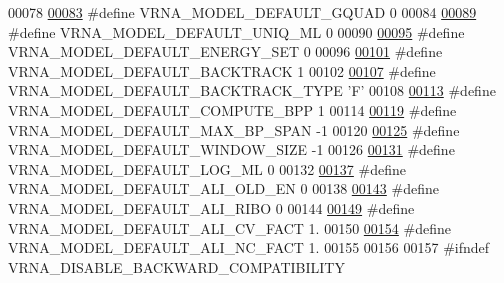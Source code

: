 \begin{DoxyCode}
00078 
\hyperlink{group__model__details_ga793ed812e86f43799b14b2deee917f23}{00083} \textcolor{preprocessor}{#define VRNA\_MODEL\_DEFAULT\_GQUAD          0}
00084 
\hyperlink{group__model__details_ga63f6006a02ba2d89148441f406c309e7}{00089} \textcolor{preprocessor}{#define VRNA\_MODEL\_DEFAULT\_UNIQ\_ML        0}
00090 
\hyperlink{group__model__details_ga6fcf6b2d0f89256cdbd166486c9b6e1e}{00095} \textcolor{preprocessor}{#define VRNA\_MODEL\_DEFAULT\_ENERGY\_SET     0}
00096 
\hyperlink{group__model__details_ga3fda8006ab84baf817bd8e5ccbc6bb35}{00101} \textcolor{preprocessor}{#define VRNA\_MODEL\_DEFAULT\_BACKTRACK      1}
00102 
\hyperlink{group__model__details_gad0e81fcaca53c4a826c68e0796de2afb}{00107} \textcolor{preprocessor}{#define VRNA\_MODEL\_DEFAULT\_BACKTRACK\_TYPE 'F'}
00108 
\hyperlink{group__model__details_ga1d6cd5051940b126c248147c011bac6c}{00113} \textcolor{preprocessor}{#define VRNA\_MODEL\_DEFAULT\_COMPUTE\_BPP    1}
00114 
\hyperlink{group__model__details_ga7cb6f4ae8fdebff6746a4410814f2977}{00119} \textcolor{preprocessor}{#define VRNA\_MODEL\_DEFAULT\_MAX\_BP\_SPAN    -1}
00120 
\hyperlink{group__model__details_ga8de04a9cb57e811e313b0f9f207f6bdb}{00125} \textcolor{preprocessor}{#define VRNA\_MODEL\_DEFAULT\_WINDOW\_SIZE    -1}
00126 
\hyperlink{group__model__details_ga938f68463e84fe060aa6502f428a517d}{00131} \textcolor{preprocessor}{#define VRNA\_MODEL\_DEFAULT\_LOG\_ML         0}
00132 
\hyperlink{group__model__details_ga2a5bbfc1edf33077e39466d2d9807115}{00137} \textcolor{preprocessor}{#define VRNA\_MODEL\_DEFAULT\_ALI\_OLD\_EN     0}
00138 
\hyperlink{group__model__details_ga64b3ab65a9ca42d4ad1d05e193083147}{00143} \textcolor{preprocessor}{#define VRNA\_MODEL\_DEFAULT\_ALI\_RIBO       0}
00144 
\hyperlink{group__model__details_gaaaf3d73d6abc18d3889676952bfedb96}{00149} \textcolor{preprocessor}{#define VRNA\_MODEL\_DEFAULT\_ALI\_CV\_FACT    1.}
00150 
\hyperlink{group__model__details_ga8f774daaafec28160c1ca5d09f2cbdba}{00154} \textcolor{preprocessor}{#define VRNA\_MODEL\_DEFAULT\_ALI\_NC\_FACT    1.}
00155 
00156 
00157 \textcolor{preprocessor}{#ifndef VRNA\_DISABLE\_BACKWARD\_COMPATIBILITY}

\end{DoxyCode}
